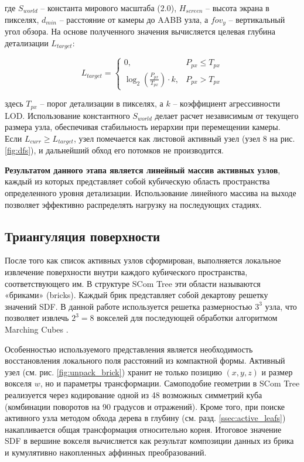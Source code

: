 где $S_{world}$ -- константа мирового масштаба ($2.0$), $H_{screen}$ -- высота экрана в пикселях, $d_{min}$ -- расстояние от камеры до AABB узла, а ${fov}_{y}$ -- вертикальный угол обзора. На основе полученного значения вычисляется целевая глубина детализации $L_{target}$:

\begin{equation}
L_{target} = 
\begin{cases} 
0, & P_{px} \le T_{px} \\
\log_2 \left( \frac{P_{px}}{T_{px}} \right) \cdot k, & P_{px} > T_{px}
\end{cases}
\end{equation}

здесь $T_{px}$ -- порог детализации в пикселях, а $k$ -- коэффициент агрессивности LOD. Использование константного $S_{world}$ делает расчет независимым от текущего размера узла, обеспечивая стабильность иерархии при перемещении камеры. Если $L_{curr} \ge L_{target}$, узел помечается как листовой активный узел (узел 8 на рис. \ref{fig:dfs}), и дальнейший обход его потомков не производится.

\textbf{Результатом данного этапа является линейный массив активных узлов}, каждый из которых представляет собой кубическую область пространства определенного уровня детализации. Использование линейного массива на выходе позволяет эффективно распределять нагрузку на последующих стадиях.

\subsection{Триангуляция поверхности} \label{ssec:marching_cubes}

После того как список активных узлов сформирован, выполняется локальное извлечение поверхности внутри каждого кубического пространства, соответствующего им. В структуре SCom Tree \cite{garifullin2025compact} эти области называются «бриками» (bricks). Каждый брик представляет собой декартову решетку значений SDF. В данной работе используется решетка размерностью $3^3$ узла, что позволяет извлечь $2^3 = 8$ вокселей для последующей обработки алгоритмом Marching Cubes \cite{lorensen1987marching}.

Особенностью используемого представления является необходимость восстановления локального поля расстояний из компактной формы. Активный узел (см. рис. \ref{fig:unpack_brick}) хранит не только позицию $(x, y, z)$ и размер вокселя $w$, но и параметры трансформации. Самоподобие геометрии в SCom Tree реализуется через кодирование одной из 48 возможных симметрий куба (комбинации поворотов на 90 градусов и отражений). Кроме того, при поиске активного узла методом обхода дерева в глубину (см. разд. \ref{ssec:active_leafs}) накапливается общая трансформация относительно корня. Итоговое значение SDF в вершине вокселя вычисляется как результат композиции данных из брика и кумулятивно накопленных аффинных преобразований.

